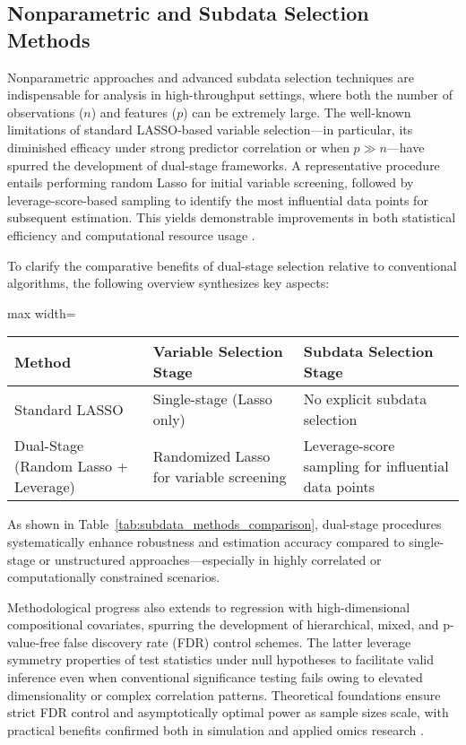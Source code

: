 \subsection{Nonparametric and Subdata Selection Methods}

Nonparametric approaches and advanced subdata selection techniques are indispensable for analysis in high-throughput settings, where both the number of observations ($n$) and features ($p$) can be extremely large. The well-known limitations of standard LASSO-based variable selection—in particular, its diminished efficacy under strong predictor correlation or when $p \gg n$—have spurred the development of dual-stage frameworks. A representative procedure entails performing random Lasso for initial variable screening, followed by leverage-score-based sampling to identify the most influential data points for subsequent estimation. This yields demonstrable improvements in both statistical efficiency and computational resource usage \cite{ref100}.

To clarify the comparative benefits of dual-stage selection relative to conventional algorithms, the following overview synthesizes key aspects:

\begin{table*}[htbp]
\centering
\caption{Comparison of Traditional and Dual-Stage Subdata Selection Methods}
\label{tab:subdata_methods_comparison}
\begin{adjustbox}{max width=\textwidth}
\begin{tabular}{lll}
\toprule
\textbf{Method} & \textbf{Variable Selection Stage} & \textbf{Subdata Selection Stage} \\
\midrule
Standard LASSO & Single-stage (Lasso only) & No explicit subdata selection \\
Dual-Stage (Random Lasso + Leverage) & Randomized Lasso for variable screening & Leverage-score sampling for influential data points \\
\bottomrule
\end{tabular}
\end{adjustbox}
\end{table*}

As shown in Table~\ref{tab:subdata_methods_comparison}, dual-stage procedures systematically enhance robustness and estimation accuracy compared to single-stage or unstructured approaches—especially in highly correlated or computationally constrained scenarios.

Methodological progress also extends to regression with high-dimensional compositional covariates, spurring the development of hierarchical, mixed, and p-value-free false discovery rate (FDR) control schemes. The latter leverage symmetry properties of test statistics under null hypotheses to facilitate valid inference even when conventional significance testing fails owing to elevated dimensionality or complex correlation patterns. Theoretical foundations ensure strict FDR control and asymptotically optimal power as sample sizes scale, with practical benefits confirmed both in simulation and applied omics research \cite{ref102}.

